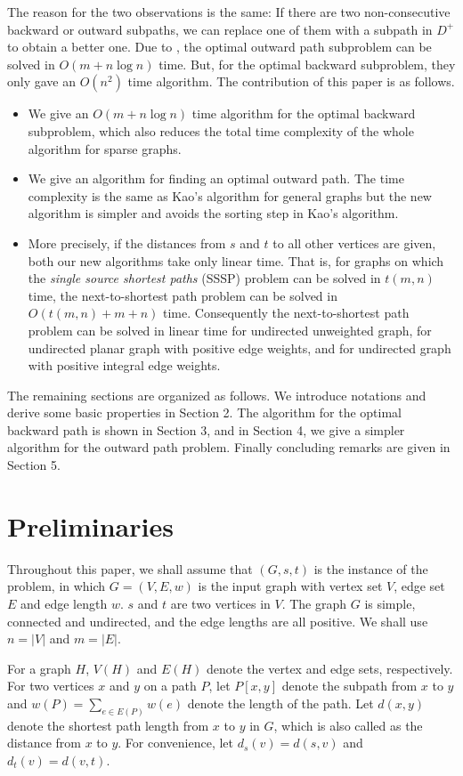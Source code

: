 The reason for the two observations is the same: If there are two non-consecutive backward or outward subpaths, we can replace one of them with a subpath in $D^+$ to obtain a better one. 
Due to \cite{kao10}, the optimal outward path subproblem can be solved in $O(m+n\log n)$ time. 
But, for the optimal backward subproblem, they only gave an $O(n^2)$ time algorithm.
The contribution of this paper is as follows.
\begin{itemize}
\item We give an $O(m+n\log n)$ time algorithm for the optimal backward subproblem, which also reduces the total time complexity of the whole algorithm for sparse graphs. 
\item We give an algorithm for finding an optimal outward path. The time complexity is the same as Kao's algorithm for general graphs but the new algorithm is simpler and avoids the sorting step in Kao's algorithm.  
\item More precisely, if the distances from $s$ and $t$ to all other vertices are given, both our new algorithms take only linear time.
That is, for graphs on which the \emph{single source shortest paths} (SSSP) problem can be solved in $t(m,n)$ time, the next-to-shortest path problem can be solved in $O(t(m,n)+m+n)$ time. Consequently the next-to-shortest path problem can be solved in linear time for undirected unweighted graph, for undirected planar graph with positive edge weights, and for undirected graph with positive integral edge weights.
\end{itemize}

The remaining sections are organized as follows. We introduce notations and derive some basic properties in Section 2. The algorithm for the optimal backward path is shown in Section 3, and in Section 4, we give a simpler algorithm for the outward path problem. Finally concluding remarks are given in Section 5. 
 
\section{Preliminaries}

Throughout this paper, we shall assume that $(G,s,t)$ is the instance of the problem, in which $G=(V,E,w)$ is the input graph with vertex set $V$, edge set $E$ and edge length $w$. 
$s$ and $t$ are two vertices in $V$. The graph $G$ is simple, connected and undirected, and the edge lengths are all positive. We shall use $n=|V|$ and $m=|E|$.

For a graph $H$, $V(H)$ and $E(H)$ denote the vertex and edge sets, respectively. 
For two vertices $x$ and $y$ on a path $P$, let $P[x,y]$ denote the subpath from $x$ to $y$ and $w(P)=\sum_{e\in E(P)}w(e)$ denote the length of the path.
Let $d(x,y)$ denote the shortest path length from $x$ to $y$ in $G$, which is also called as the distance from $x$ to $y$. 
For convenience, let $d_s(v)=d(s,v)$ and $d_t(v)=d(v,t)$. 

